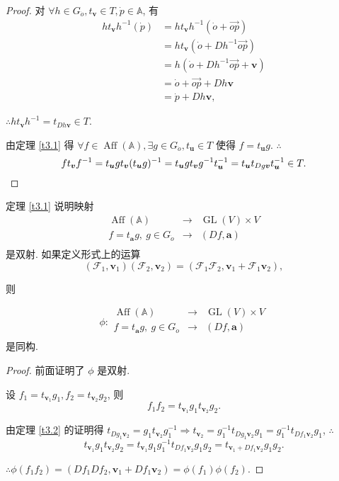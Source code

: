 \documentclass{ctexart}
\begin{document}
\begin{proof}
    对 $\forall h\in G_{\dot{o}},t_{\boldsymbol{v}}\in T,\dot{p}\in\mathbb{A}$, 有
    \begin{align*}
        ht_{\boldsymbol{v}}h^{-1}(\dot{p}) & =ht_{\boldsymbol{v}}h^{-1}(\dot{o}+\overrightarrow{op}) \\
        & =ht_{\boldsymbol{v}}(\dot{o}+Dh^{-1}\overrightarrow{op}) \\
        & =h(\dot{o}+Dh^{-1}\overrightarrow{op}+\boldsymbol{v}) \\
        & =\dot{o}+\overrightarrow{op}+Dh\boldsymbol{v} \\
        & =\dot{p}+Dh\boldsymbol{v},
    \end{align*}

    $\therefore ht_{\boldsymbol{v}}h^{-1}=t_{Dh\boldsymbol{v}}\in T$.

    由定理 \ref{t3.1} 得 $\forall f\in\operatorname{Aff}(\mathbb{A}),\exists g\in G_{\dot{o}},t_{\boldsymbol{u}}\in T$ 使得 $f=t_{\boldsymbol{u}}g$. $\therefore$
    \[ft_{\boldsymbol{v}}f^{-1}=t_{\boldsymbol{u}}gt_{\boldsymbol{v}}(t_{\boldsymbol{u}}g)^{-1}=t_{\boldsymbol{u}}gt_{\boldsymbol{v}}g^{-1}t_{\boldsymbol{u}}^{-1}=t_{\boldsymbol{u}}t_{Dg\boldsymbol{v}}t_{\boldsymbol{u}}^{-1}\in T.\qedhere\]
\end{proof}
定理 \ref{t3.1} 说明映射
\[\begin{array}{rcl}
    \operatorname{Aff}(\mathbb{A}) & \to & \operatorname{GL}(V)\times V \\
    f=t_{\boldsymbol{a}}g,\ g\in G_{\dot{o}} & \to & (Df,\boldsymbol{a}) \\
\end{array}\]
是双射. 如果定义形式上的运算
\[(\mathcal{F}_1,\boldsymbol{v}_1)(\mathcal{F}_2,\boldsymbol{v}_2)=(\mathcal{F}_1\mathcal{F}_2,\boldsymbol{v}_1+\mathcal{F}_1\boldsymbol{v}_2),\]

则
\begin{theorem}\label{t3.3}
    \[\phi:\begin{array}{rcl}
        \operatorname{Aff}(\mathbb{A}) & \to & \operatorname{GL}(V)\times V \\
        f=t_{\boldsymbol{a}}g,\ g\in G_{\dot{o}} & \to & (Df,\boldsymbol{a}) \\
    \end{array}\]
    是同构.
\end{theorem}
\begin{proof}
    前面证明了 $\phi$ 是双射.

    设 $f_1=t_{\boldsymbol{v}_1}g_1,f_2=t_{\boldsymbol{v}_2}g_2$, 则
    \[f_1f_2=t_{\boldsymbol{v}_1}g_1t_{\boldsymbol{v}_2}g_2.\]

    由定理 \ref{t3.2} 的证明得 $t_{Dg_1\boldsymbol{v}_2}=g_1t_{\boldsymbol{v}_2}g_1^{-1}\Rightarrow t_{\boldsymbol{v}_2}=g_1^{-1}t_{Dg_1\boldsymbol{v}_2}g_1=g_1^{-1}t_{Df_1\boldsymbol{v}_2}g_1$, $\therefore$
    \[t_{\boldsymbol{v}_1}g_1t_{\boldsymbol{v}_2}g_2=t_{\boldsymbol{v}_1}g_1g_1^{-1}t_{Df_1\boldsymbol{v}_2}g_1g_2=t_{\boldsymbol{v}_1+Df_1\boldsymbol{v}_2}g_1g_2.\]

    $\therefore\phi(f_1f_2)=(Df_1Df_2,\boldsymbol{v}_1+Df_1\boldsymbol{v}_2)=\phi(f_1)\phi(f_2)$.
\end{proof}
\end{document}
